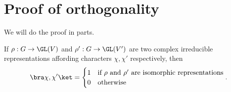 \documentclass[a4paper]{article}
\begin{document}
\section{Proof of orthogonality}
We will do the proof in parts.

\begin{thm}
  If $\rho: G \to \GL(V)$ and $\rho': G \to \GL(V')$ are two complex irreducible representations affording characters $\chi, \chi'$ respectively, then
  \[
    \bra \chi, \chi'\ket =
    \begin{cases}
      1 & \text{if $\rho$ and $\rho'$ are isomorphic representations}\\
      0 & \text{otherwise}
    \end{cases}.
  \]
\end{thm}
\end{document}

